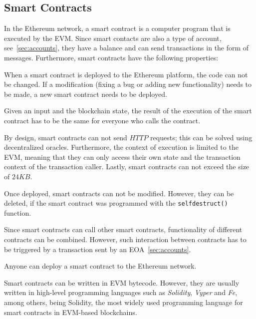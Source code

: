 \documentclass[11pt,a4paper]{report}
\begin{document}
\subsection{Smart Contracts}\label{sec:sc}
In the Ethereum network, a smart contract\cite{book:masteringETH-sc-solidity}\cite{smartcontracts} is a computer program that is executed by the EVM. Since smart contacts are also a type of account, see~\ref{sec:accounts}, they have a balance and can send transactions in the form of messages. Furthermore, smart contracts have the following properties:
\begin{description}[style=nextline] %
	\item[{\textbf{Immutability}}] When a smart contract is deployed to the Ethereum platform, the code can not be changed. If a modification (fixing a bug or adding new functionality) needs to be made, a new smart contract needs to be deployed.
	\item[{\textbf{Determinism}}] Given an input and the blockchain state, the result of the execution of the smart contract has to be the same for everyone who calls the contract.
	\item[{\textbf{Limitations}}] By design, smart contracts can not send $HTTP$ requests; this can be solved using decentralized oracles\cite{oracles}. Furthermore, the context of execution is limited to the EVM, meaning that they can only access their own state and the transaction context of the transaction caller. Lastly, smart contracts can not exceed the size of $24KB$.
	\item[{\textbf{Lifecycle}}] Once deployed, smart contracts can not be modified. However, they can be deleted, if the smart contract was programmed with the \verb|selfdestruct()| function.
	\item[{\textbf{Composability}}] Since smart contracts can call other smart contracts, functionality of different contracts can be combined. However, such interaction between contracts has to be triggered by a transaction sent by an EOA~\ref{sec:accounts}.
	\item[{\textbf{Permissionless}}] Anyone can deploy a smart contract to the Ethereum network.    
\end{description}
Smart contracts can be written in EVM bytecode\cite{evmbytecode}. However, they are usually written in high-level programming languages such as \textit{Solidity}, \textit{Vyper}\cite{vyper} and \textit{Fe}\cite{fe}, among others, being Solidity, the most widely used programming language for smart contracts in EVM-based blockchains.
\end{document}
